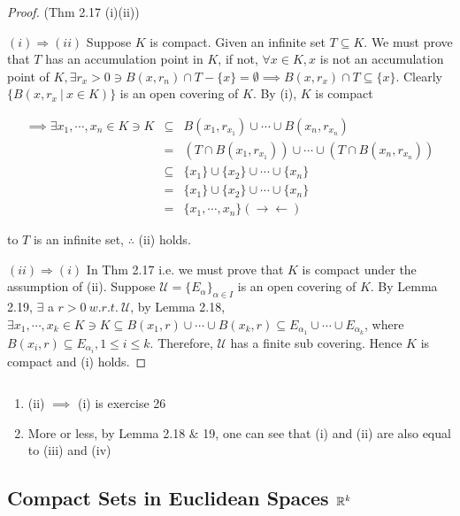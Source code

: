 \begin{proof}(Thm 2.17 (i)(ii))
	
	$(i) \Rightarrow (ii)$ Suppose $K$ is compact. Given an infinite set $T \subseteq K$. We must prove that $T$ has an accumulation point in $K$, if not, $\forall x \in K, x$ is not an accumulation point of $K,\exists r_x > 0 \ni B(x,r_n) \cap T - \{x\} = \emptyset \implies B(x,r_x) \cap T \subseteq \{x\}$. Clearly $\{B(x,r_x~|~x \in K)\}$ is an open covering of $K$. By (i), $K$ is compact
	
	 \begin{eqnarray*}
	 	\implies \exists x_1,\cdots,x_n \in K \ni K &\subseteq& B(x_1,r_{x_1}) \cup \cdots \cup B(x_n,r_{x_n})\\
	 	&=& (T \cap B(x_1,r_{x_1})) \cup \cdots \cup (T \cap B(x_n,r_{x_n}))\\
	 	&\subseteq& \{x_1\} \cup \{x_2\} \cup \cdots \cup \{x_n\}\\
	 	&=& \{x_1\} \cup \{x_2\} \cup \cdots \cup \{x_n\}\\
	 	&=& \{x_1,\cdots,x_n\} (\rightarrow \leftarrow)
	 \end{eqnarray*}
	 
	 to $T$ is an infinite set, $\therefore$ (ii) holds.
	 
	 $(ii) \Rightarrow (i)$ In Thm 2.17 i.e. we must prove that $K$ is compact under the assumption of (ii). Suppose $\mathscr{U} = \{E_{\alpha}\}_{\alpha \in I}$ is an open covering of $K$. By Lemma 2.19, $\exists$ a $r > 0 ~w.r.t.~ \mathscr{U}$, by Lemma 2.18, $\exists x_1,\cdots,x_k \in K \ni K \subseteq B(x_1,r) \cup \cdots \cup B(x_k,r) \subseteq E_{\alpha_1}\cup \cdots\cup E_{\alpha_k}$, where $B(x_i,r) \subseteq E_{\alpha_i}, 1 \leq i \leq k$. Therefore, $\mathscr{U}$ has a finite sub covering. Hence $K$ is compact and (i) holds.
\end{proof}

\begin{rmk*}$ $
	\begin{enumerate}[wide]
		\item (ii) $\implies$ (i) is exercise 26
		\item More or less, by Lemma 2.18 $\&$ 19, one can see that (i) and (ii) are also equal to (iii) and (iv) 
	\end{enumerate}
\end{rmk*}

\newpage

\subsection{Compact Sets in Euclidean Spaces $\mathbb{R}^k$}

